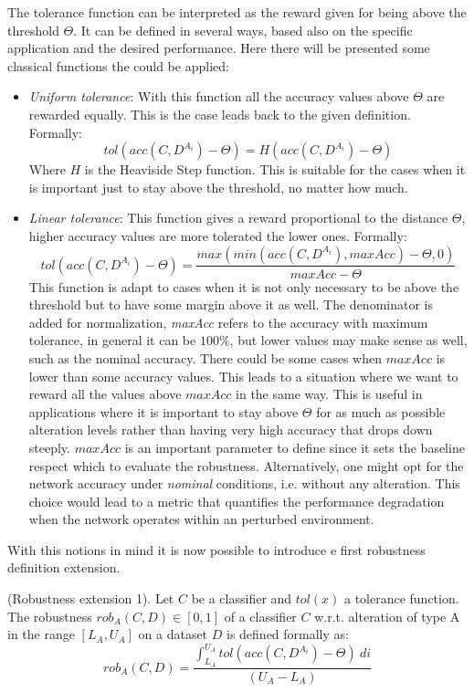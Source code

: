 The tolerance function can be interpreted as the reward given for being above the threshold $\Theta$. It can be defined in several ways, based also on the specific application and the desired performance. Here there will be presented some classical functions the could be applied:

\begin{itemize}
	\item \textit{Uniform tolerance}: With this function all the accuracy values above $\Theta$ are rewarded equally. This is the case leads back to the given definition. Formally: 
	\[
		tol(acc(C,D^{A_i}) - \Theta) = H(acc(C,D^{A_i}) - \Theta)
	\]
	Where $H$ is the Heaviside Step function. This is suitable for the cases when it is important just to stay above the threshold, no matter how much.
	\item \textit{Linear tolerance}: This function gives a reward proportional to the distance $\Theta$, higher accuracy values are more tolerated the lower ones. Formally: 
	\[
		tol(acc(C,D^{A_i}) - \Theta) = \frac{max(min(acc(C,D^{A_i}), maxAcc) - \Theta, 0)}{maxAcc - \Theta}
	\]
	This function is adapt to cases when it is not only necessary to be above the threshold but to have some margin above it as well. The denominator is added for normalization, \textit{maxAcc} refers to the accuracy with maximum tolerance, in general it can be $100\%$, but lower values may make sense as well, such as the nominal accuracy. There could be some cases when $maxAcc$ is lower than some accuracy values. This leads to a situation where we want to reward all the values above $maxAcc$ in the same way. This is useful in applications where it is important to stay above $\Theta$ for as much as possible alteration levels rather than having very high accuracy that drops down steeply. $maxAcc$ is an important parameter to define since it sets the baseline respect which to evaluate the robustness. Alternatively, one might opt for the network accuracy under \textit{nominal} conditions, i.e. without any alteration. This choice would lead to a metric that quantifies the performance degradation when the network operates within an perturbed environment. 
\end{itemize}

With this notions in mind it is now possible to introduce e first robustness definition extension.

\begin{definition} (Robustness extension 1).
	Let $C$ be a classifier and $tol(x)$ a tolerance function.
	The robustness $rob_A(C,D) \in [0,1]$ of a classifier $C$ w.r.t. alteration of type A in the range $[L_A, U_A]$ on a dataset $D$ is defined formally as:
	\[
		rob_A(C,D) = \frac{\int_{L_A}^{U_A} tol(acc(C,D^{A_i}) - \Theta) \ di}{(U_A - L_A)}
	\]
\end{definition}


